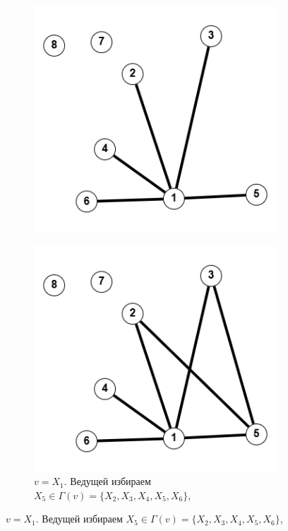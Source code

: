 \documentclass{article}
\begin{document}
\begin{enumerate}
\begin{figure}
\begin{subfigure}[b]{0.2\textwidth}
         \includegraphics[width=\textwidth]{attachments/3/2.png}
         \label{fig:3_1}
     \end{subfigure}
     \hfill
     \begin{subfigure}[b]{0.2\textwidth}
         \centering
         \caption*{\footnotesize{$v = X_1$. Ведущей избираем $X_5 \in \Gamma(v)=\{X_2,X_3,X_4,X_5,X_6\}$,}}
         \includegraphics[width=\textwidth]{attachments/3/3.png}

\end{subfigure}
\end{figure}
\end{enumerate}
\end{document}
